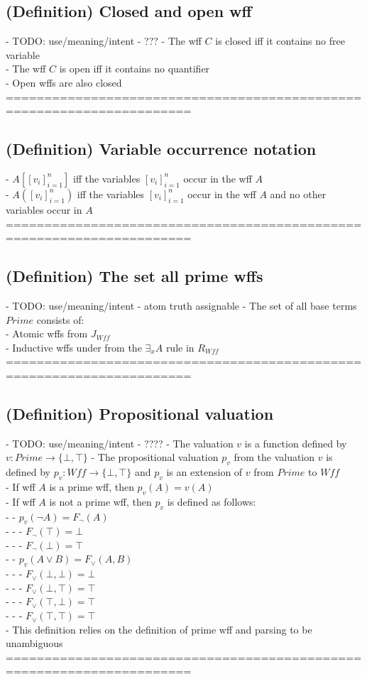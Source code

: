 \documentclass{article}
\begin{document}
\subsection{(Definition) Closed and open wff}
	- TODO: use/meaning/intent - ???
	- The wff $C$ is closed iff it contains no free variable \\
	- The wff $C$ is open iff it contains no quantifier \\
		- Open wffs are also closed \\
	======================================================================
\subsection{(Definition) Variable occurrence notation}
	- $A[[v_i]_{i=1}^n]$ iff the variables $[v_i]_{i=1}^n$ occur in the wff $A$ \\
	- $A([v_i]_{i=1}^n)$ iff the variables $[v_i]_{i=1}^n$ occur in the wff $A$ and no other variables occur in $A$ \\
	======================================================================
\subsection{(Definition) The set all prime wffs}
	- TODO: use/meaning/intent - atom truth assignable
	- The set of all base terms $Prime$ consists of: \\
		- Atomic wffs from $J_{Wff}$ \\
		- Inductive wffs under from the $\exists_x A$ rule in $R_{Wff}$ \\
	======================================================================
\subsection{(Definition) Propositional valuation}
	- TODO: use/meaning/intent - ????
	- The valuation $v$ is a function defined by $v: Prime \rightarrow \{\bot, \top\}$
	- The propositional valuation $p_v$ from the valuation $v$ is defined by $p_v: Wff \rightarrow \{\bot, \top\}$ and $p_v$ is an extension of $v$ from $Prime$ to $Wff$ \\
	- If wff $A$ is a prime wff, then $p_v(A) = v(A)$ \\
	- If wff $A$ is not a prime wff, then $p_v$ is defined as follows: \\
		- - $p_v(\lnot A) = F_\lnot(A)$ \\
			- - - $F_\lnot(\top) = \bot$ \\
			- - - $F_\lnot(\bot) = \top$ \\
		- - $p_v(A \lor B) = F_\lor(A, B)$ \\
			- - - $F_\lor(\bot, \bot) = \bot$ \\
			- - - $F_\lor(\bot, \top) = \top$ \\
			- - - $F_\lor(\top, \bot) = \top$ \\
			- - - $F_\lor(\top, \top) = \top$ \\
	- This definition relies on the definition of prime wff and parsing to be unambiguous
	======================================================================
\end{document}
